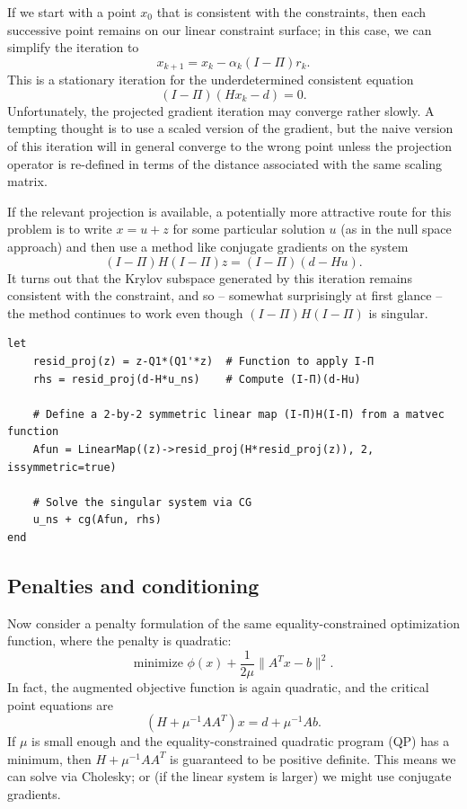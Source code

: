 \documentclass[12pt, leqno]{article} %
\begin{document}
If we start with a point \(x_0\) that is consistent with the
constraints, then each successive point remains on our linear constraint
surface; in this case, we can simplify the iteration to
\[x_{k+1} = x_k - \alpha_k (I-\Pi) r_k.\] This is a stationary iteration
for the underdetermined consistent equation \[(I-\Pi) (Hx_k-d) = 0.\]
Unfortunately, the projected gradient iteration may converge rather
slowly. A tempting thought is to use a scaled version of the gradient,
but the naive version of this iteration will in general converge to the
wrong point unless the projection operator is re-defined in terms of the
distance associated with the same scaling matrix.

If the relevant projection is available, a potentially more attractive
route for this problem is to write \(x = u + z\) for some particular
solution \(u\) (as in the null space approach) and then use a method
like conjugate gradients on the system
\[(I-\Pi) H (I-\Pi) z = (I-\Pi) (d - Hu).\] It turns out that the Krylov
subspace generated by this iteration remains consistent with the
constraint, and so -- somewhat surprisingly at first glance -- the
method continues to work even though \((I-\Pi) H (I-\Pi)\) is singular.

\begin{verbatim}
let
    resid_proj(z) = z-Q1*(Q1'*z)  # Function to apply I-Π
    rhs = resid_proj(d-H*u_ns)    # Compute (I-Π)(d-Hu)

    # Define a 2-by-2 symmetric linear map (I-Π)H(I-Π) from a matvec function
    Afun = LinearMap((z)->resid_proj(H*resid_proj(z)), 2, issymmetric=true)
    
    # Solve the singular system via CG
    u_ns + cg(Afun, rhs)
end
\end{verbatim}

\subsection{Penalties and conditioning}

Now consider a penalty formulation of the same equality-constrained
optimization function, where the penalty is quadratic:
\[\mbox{minimize } \phi(x) + \frac{1}{2\mu} \|A^T x-b\|^2.\] In fact,
the augmented objective function is again quadratic, and the critical
point equations are \[(H + \mu^{-1} AA^T) x = d + \mu^{-1} A b.\] If
\(\mu\) is small enough and the equality-constrained quadratic program
(QP) has a minimum, then \(H+\mu^{-1} AA^T\) is guaranteed to be
positive definite. This means we can solve via Cholesky; or (if the
linear system is larger) we might use conjugate gradients.
\end{document}
